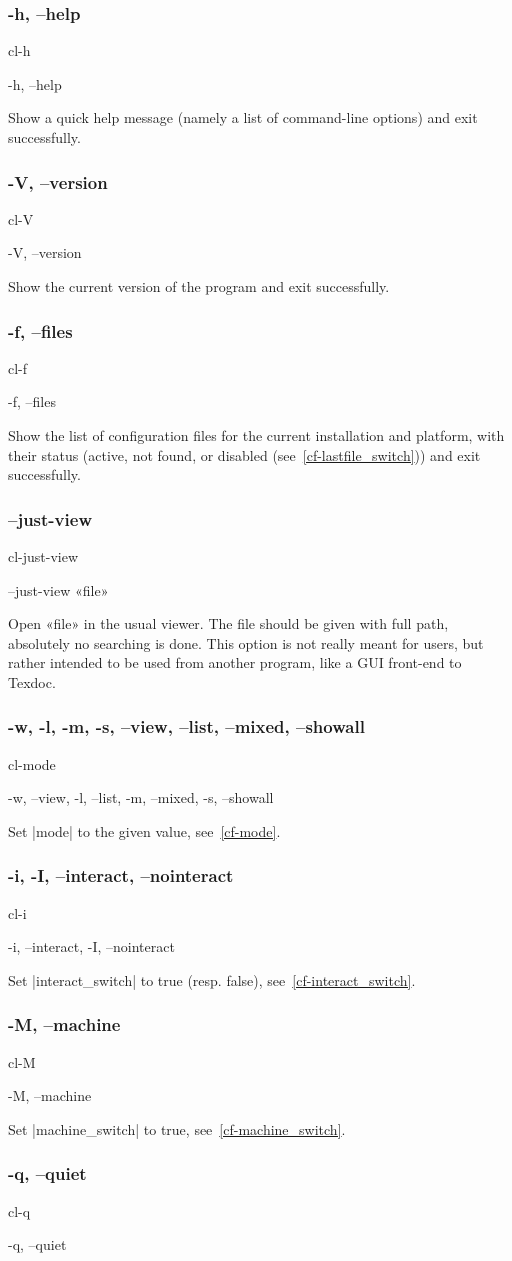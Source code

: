 \documentclass[a4paper, oneside]{scrartcl}
\newif\ifframed
\newenvironment{cmdsubsub}[2]{%
  \framedfalse \commandes\subsubsection{#1}{#2}%
  }{%
  \endcommandes}
\begin{document}
\begin{cmdsubsub}{-h, --help}{cl-h}
  -h, --help
\end{cmdsubsub}

Show a quick help message (namely a list of command-line options) and exit
successfully.

\begin{cmdsubsub}{-V, --version}{cl-V}
  -V, --version
\end{cmdsubsub}

Show the current version of the program and exit successfully.

\begin{cmdsubsub}{-f, --files}{cl-f}
  -f, --files
\end{cmdsubsub}

Show the list of configuration files for the current installation and
platform, with their status (active, not found, or disabled
(see~\ref{cf-lastfile_switch})) and exit successfully.

\begin{cmdsubsub}{--just-view}{cl-just-view}
  --just-view «file»
\end{cmdsubsub}

Open «file» in the usual viewer. The file should be given with full path,
absolutely no searching is done. This option is not really meant for users,
but rather intended to be used from another program, like a GUI front-end to
Texdoc.

\begin{cmdsubsub}{-w, -l, -m, -s, --view, --list, --mixed, --showall}{cl-mode}
  -w, --view, -l, --list, -m, --mixed, -s, --showall
\end{cmdsubsub}

Set |mode| to the given value, see~\ref{cf-mode}.

\begin{cmdsubsub}{-i, -I, --interact, --nointeract}{cl-i}
  -i, --interact, -I, --nointeract
\end{cmdsubsub}

Set |interact_switch| to true (resp. false), see~\ref{cf-interact_switch}.

\begin{cmdsubsub}{-M, --machine}{cl-M}
  -M, --machine
\end{cmdsubsub}

Set |machine_switch| to true, see~\ref{cf-machine_switch}.

\begin{cmdsubsub}{-q, --quiet}{cl-q}
  -q, --quiet
\end{cmdsubsub}
\end{document}

